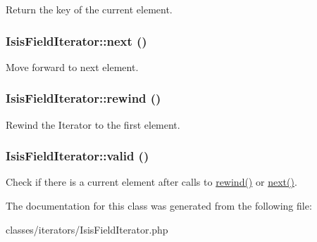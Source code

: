\label{classIsisFieldIterator_afad4839168701adff27f1037b2d8fafc}
Return the key of the current element. \hypertarget{classIsisFieldIterator_a7a8b7866abd01b6e7ea07c7bb24e9de0}{
\subsubsection[{next}]{\setlength{\rightskip}{0pt plus 5cm}IsisFieldIterator::next ()}}
\label{classIsisFieldIterator_a7a8b7866abd01b6e7ea07c7bb24e9de0}
Move forward to next element. \hypertarget{classIsisFieldIterator_a19e38c95726a11124f0a46228095cea0}{
\subsubsection[{rewind}]{\setlength{\rightskip}{0pt plus 5cm}IsisFieldIterator::rewind ()}}
\label{classIsisFieldIterator_a19e38c95726a11124f0a46228095cea0}
Rewind the Iterator to the first element. \hypertarget{classIsisFieldIterator_a030cf47b3e4d174e9409c635ce1b49c7}{
\subsubsection[{valid}]{\setlength{\rightskip}{0pt plus 5cm}IsisFieldIterator::valid ()}}
\label{classIsisFieldIterator_a030cf47b3e4d174e9409c635ce1b49c7}
Check if there is a current element after calls to \hyperlink{classIsisFieldIterator_a19e38c95726a11124f0a46228095cea0}{rewind()} or \hyperlink{classIsisFieldIterator_a7a8b7866abd01b6e7ea07c7bb24e9de0}{next()}. 

The documentation for this class was generated from the following file:\begin{DoxyCompactItemize}
\item 
classes/iterators/IsisFieldIterator.php\end{DoxyCompactItemize}
